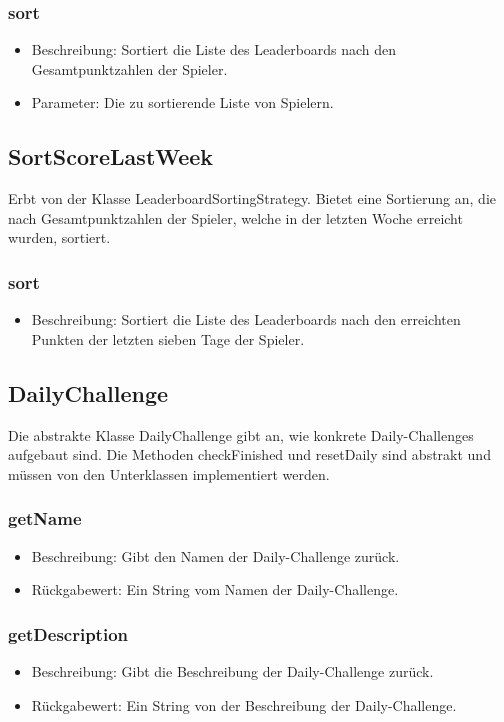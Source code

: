 \documentclass[a4paper]{scrreprt}
\begin{document}
	\subsubsection{sort}
	\begin{itemize}
		\item Beschreibung: Sortiert die Liste des Leaderboards nach den Gesamtpunktzahlen der Spieler.
		\item Parameter: Die zu sortierende Liste von Spielern.
	\end{itemize}

	\subsection{SortScoreLastWeek}
	Erbt von der Klasse LeaderboardSortingStrategy. Bietet eine Sortierung an, die nach Gesamtpunktzahlen der Spieler, welche in der letzten Woche erreicht wurden, sortiert.
	\subsubsection{sort}
	\begin{itemize}
		\item Beschreibung: Sortiert die Liste des Leaderboards nach den erreichten Punkten der letzten sieben Tage der Spieler.
	\end{itemize}


	\subsection{DailyChallenge}
	Die abstrakte Klasse DailyChallenge gibt an, wie konkrete Daily-Challenges aufgebaut sind. Die Methoden checkFinished und resetDaily sind abstrakt und müssen von den Unterklassen implementiert werden. \\

	\subsubsection{getName}
	\begin{itemize}
		\item Beschreibung: Gibt den Namen der Daily-Challenge zurück.
		\item Rückgabewert: Ein String vom Namen der Daily-Challenge.
	\end{itemize}
	\subsubsection{getDescription}
	\begin{itemize}
		\item Beschreibung: Gibt die Beschreibung der Daily-Challenge zurück.
		\item Rückgabewert: Ein String von der Beschreibung der Daily-Challenge.
	\end{itemize}
\end{document}
